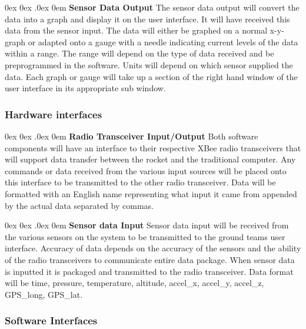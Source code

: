 \documentclass[10pt,draftclsnofoot,onecolumn,compsoc]{IEEEtran}
\makeatletter
\renewcommand\paragraph{\@startsection{paragraph}{4}{\z@}%
                                    {0ex \@plus0ex \@minus.0ex}%
                                    {0em}%
                                    {\normalfont\normalsize\bfseries}}
\makeatother
\begin{document}
\paragraph{\bf Sensor Data Output}
The sensor data output will convert the data into a graph and display it on the user interface. It will have received this data from the sensor input. The data will either be graphed on a normal x-y-graph or adapted onto a gauge with a needle indicating current levels of the data within a range. The range will depend on the type of data received and be preprogrammed in the software. Units will depend on which sensor supplied the data. Each graph or gauge will take up a section of the right hand window of the user interface in its appropriate sub window. 


\subsubsection{Hardware interfaces }
\paragraph{\bf Radio Transceiver Input/Output}
		Both software components will have an interface to their respective XBee radio transceivers that will support data transfer between the rocket and the traditional computer. Any commands or data received from the various input sources will be placed onto this interface to be transmitted to the other radio transceiver. Data will be formatted with an English name representing what input it came from appended by the actual data separated by commas.

\paragraph{\bf Sensor data Input}
Sensor data input will be received from the various sensors on the system to be transmitted to the ground teams user interface. Accuracy of data depends on the accuracy of the sensors and the ability of the radio transceivers to communicate entire data package. When sensor data is inputted it is packaged and transmitted to the radio transceiver. Data format will be time, pressure, temperature, altitude, accel\_x, accel\_y, accel\_z, GPS\_long, GPS\_lat.

\subsubsection{Software Interfaces}
\end{document}
